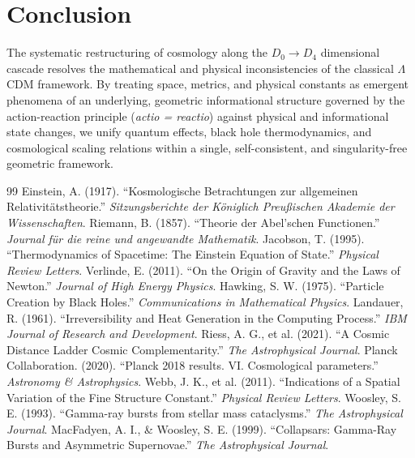 \documentclass[11pt,a4paper]{article}
\theoremstyle{plain}
\theoremstyle{definition}
\theoremstyle{remark}
\begin{document}
\section{Conclusion}
The systematic restructuring of cosmology along the $D_0 \to D_4$ dimensional cascade resolves the mathematical and physical inconsistencies of the classical $\Lambda$CDM framework. By treating space, metrics, and physical constants as emergent phenomena of an underlying, geometric informational structure governed by the action-reaction principle (\textit{actio = reactio}) against physical and informational state changes, we unify quantum effects, black hole thermodynamics, and cosmological scaling relations within a single, self-consistent, and singularity-free geometric framework.

\begin{thebibliography}{99}
 Einstein, A. (1917). ``Kosmologische Betrachtungen zur allgemeinen Relativitätstheorie.'' \textit{Sitzungsberichte der Königlich Preußischen Akademie der Wissenschaften}.
 Riemann, B. (1857). ``Theorie der Abel'schen Functionen.'' \textit{Journal für die reine und angewandte Mathematik}.
 Jacobson, T. (1995). ``Thermodynamics of Spacetime: The Einstein Equation of State.'' \textit{Physical Review Letters}.
 Verlinde, E. (2011). ``On the Origin of Gravity and the Laws of Newton.'' \textit{Journal of High Energy Physics}.
 Hawking, S. W. (1975). ``Particle Creation by Black Holes.'' \textit{Communications in Mathematical Physics}.
 Landauer, R. (1961). ``Irreversibility and Heat Generation in the Computing Process.'' \textit{IBM Journal of Research and Development}.
 Riess, A. G., et al. (2021). ``A Cosmic Distance Ladder Cosmic Complementarity.'' \textit{The Astrophysical Journal}.
 Planck Collaboration. (2020). ``Planck 2018 results. VI. Cosmological parameters.'' \textit{Astronomy \& Astrophysics}.
 Webb, J. K., et al. (2011). ``Indications of a Spatial Variation of the Fine Structure Constant.'' \textit{Physical Review Letters}.
 Woosley, S. E. (1993). ``Gamma-ray bursts from stellar mass cataclysms.'' \textit{The Astrophysical Journal}.
 MacFadyen, A. I., \& Woosley, S. E. (1999). ``Collapsars: Gamma-Ray Bursts and Asymmetric Supernovae.'' \textit{The Astrophysical Journal}.
\end{thebibliography}
\end{document}
